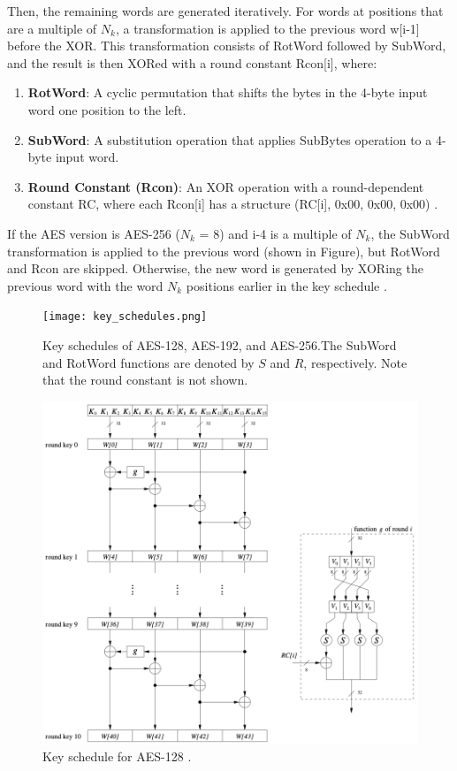 Then, the remaining words are generated iteratively. For words at positions that are a multiple of $N_k$, a 
transformation is applied to the previous word w[i-1] before the \Gls{XOR}. This transformation consists of RotWord 
followed by SubWord, and the result is then XORed with a round constant Rcon[i], where:

\begin{enumerate}
    \item \textbf{RotWord}: A cyclic permutation that shifts the bytes in the 4-byte input word one position to the left. 
    \item \textbf{SubWord}: A substitution operation that applies SubBytes operation to a 4-byte input word. 
    \item \textbf{Round Constant (Rcon)}:  An \Gls{XOR} operation with a round-dependent constant RC, where each Rcon[i]
    has a structure (RC[i], 0x00, 0x00, 0x00) \cite{NIST_AES}. 
\end{enumerate}

If the AES version is AES-256 ($N_k$ = 8) and i-4 is a multiple of $N_k$, the SubWord transformation is applied to the 
previous word (shown in Figure), but RotWord and Rcon are skipped. Otherwise, the new word is generated by XORing the previous word 
with the word $N_k$ positions earlier in the key schedule \cite{NIST_AES}. 

\begin{figure}[h] %
    \centering
    \texttt{[image: key\_schedules.png]} %
    \caption{
        Key schedules of AES-128, AES-192, and AES-256.The SubWord and
        RotWord functions are denoted by $S$ and $R$, respectively. Note that the round
        constant is not shown. \cite{Key_Collisions}
    }
    \label{fig:key_comb} %
\end{figure}

\begin{figure}[h]
    \centering
    \includegraphics[width=.8\textwidth]{img/key-schedule-128.png}
    \caption{Key schedule for AES-128 \cite{Paar2024}.}
    \label{fig:key-schedule-128}
\end{figure}

